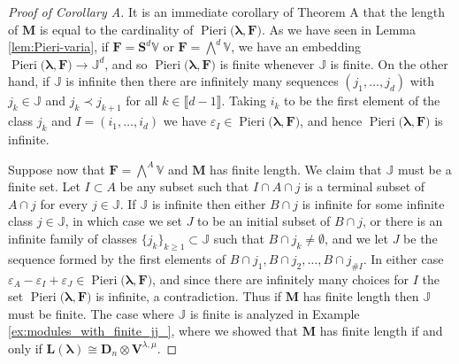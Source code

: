 \documentclass[11pt,fleqn]{amsart}
\newcommand\JJ{\mathbb J}
\renewcommand\to{\longrightarrow}
\renewcommand\epsilon{\varepsilon}
\theoremstyle{definition}
\theoremstyle{remark}
\theoremstyle{remark}
\newcommand\VV{\mathbb V}
\renewcommand\SS{\mathbf S}
\newcommand\interval[1]{\llbracket{#1}\rrbracket}
\newcommand\wt[1]{\boldsymbol{#1}}
\newcommand\Pieri[2]{\operatorname{Pieri}{(#1},{#2)}}
\begin{document}
\begin{proof}[Proof of Corollary A]
It is an immediate corollary of Theorem A that the length of $\mathbf M$ is 
equal to the cardinality of $\Pieri{\wt\lambda}{\mathbf F}$. As we have seen in 
Lemma \ref{lem:Pieri-varia}, if $\mathbf F = \SS^d \VV$ or $\mathbf F = 
\bigwedge^d \VV$, we have an embedding $\Pieri{\wt\lambda}{\mathbf F} \to 
\JJ^d$, and so $\Pieri{\wt\lambda}{\mathbf F}$ is finite whenever $\JJ$ is 
finite. On the other hand, if $\JJ$ is infinite then there are infinitely many 
sequences $(j_1, \ldots, j_d)$ with $j_k \in \JJ$ and $j_k \prec j_{k+1}$ for 
all $k \in \interval{d-1}$. Taking $i_k$ to be the first element of the class 
$j_k$ and $I = (i_1, \ldots, i_d)$ we have $\epsilon_I \in \Pieri{\wt\lambda}
{\mathbf F}$, and hence $\Pieri{\wt\lambda}{\mathbf F}$ is infinite.

Suppose now that $\mathbf F = \bigwedge^A \VV$ and $\mathbf M$ has finite 
length. We claim that $\JJ$ must be a finite set. Let $I \subset A$ be any 
subset such that $I \cap A \cap j$ is a terminal subset of $A \cap j$ for every
$j \in \JJ$. If $\JJ$ is infinite then either $B \cap j$ is infinite for some 
infinite class $j \in \JJ$, in which case we set $J$ to be an initial subset of 
$B \cap j$, or there is an infinite family of classes $\{j_k\}_{k \geq 1} 
\subset \JJ$ such that $B \cap j_k \neq \emptyset$, and we let $J$ be the 
sequence formed by the first elements of $B\cap j_1, B\cap j_2, \ldots, B \cap 
j_{\#I}$. In either case $\epsilon_A - \epsilon_I + \epsilon_J \in 
\Pieri{\wt\lambda}{\mathbf F}$, and since there are infinitely many choices for 
$I$ the set $\Pieri{\wt\lambda}{\mathbf F}$ is infinite, a contradiction. Thus 
if $\mathbf M$ has finite length then $\JJ$ must be finite. The case where $\JJ$
is finite is analyzed in Example \ref{ex:modules_with_finite_jj_}, where we 
showed that $\mathbf M$ has finite length if and only if $\mathbf L(\wt\lambda)
\cong \mathbf D_n \otimes \mathbf V^{\lambda,\mu}$.
\end{proof}
\end{document}
